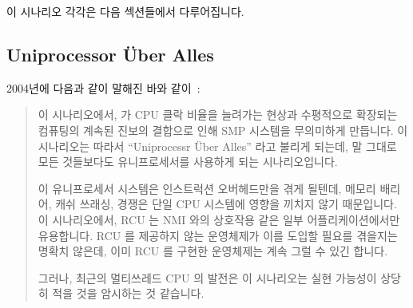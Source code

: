 이 시나리오 각각은 다음 섹션들에서 다루어집니다.

\subsection{Uniprocessor \"Uber Alles}
\label{sec:future:Uniprocessor \"Uber Alles}

2004년에 다음과 같이 말해진 바와 같이~\cite{PaulEdwardMcKenneyPhD}:

\begin{quote}
	이 시나리오에서,  가 CPU 클락 비율을
	늘려가는 현상과 수평적으로 확장되는 컴퓨팅의 계속된 진보의 결합으로
	인해 SMP 시스템을 무의미하게 만듭니다.
	이 시나리오는 따라서 ``Uniprocessr \"Uber Alles'' 라고 불리게 되는데,
	말 그대로 모든 것들보다도 유니프로세서를 사용하게 되는 시나리오입니다.

	이 유니프로세서 시스템은 인스트럭션 오버헤드만을 겪게 될텐데, 메모리
	배리어, 캐쉬 쓰래싱, 경쟁은 단일 CPU 시스템에 영향을 끼치지 않기
	때문입니다.
	이 시나리오에서, RCU 는 NMI 와의 상호작용 같은 일부 어플리케이션에서만
	유용합니다.
	RCU 를 제공하지 않는 운영체제가 이를 도입할 필요를 겪을지는 명확치
	않은데, 이미 RCU 를 구현한 운영체제는 계속 그럴 수 있긴 합니다.

	그러나, 최근의 멀티쓰레드 CPU 의 발전은 이 시나리오는 실현 가능성이
	상당히 적을 것을 암시하는 것 같습니다.

\end{quote}

